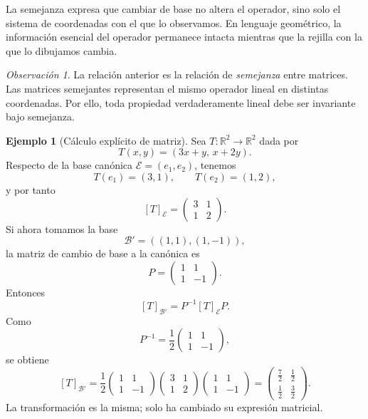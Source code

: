 \documentclass[10pt,a4paper,oneside]{article}
\theoremstyle{plain}
\theoremstyle{definition}
\newtheorem{example}[theorem]{Ejemplo}
\theoremstyle{remark}
\newtheorem{remark}[theorem]{Observación}
\newcommand{\R}{\mathbb{R}}
\begin{document}
\begin{intuitionBox}
La semejanza expresa que cambiar de base no altera el operador, sino solo el sistema de coordenadas con el que lo observamos. En lenguaje geométrico, la información esencial del operador permanece intacta mientras que la rejilla con la que lo dibujamos cambia.
\end{intuitionBox}

\begin{remark}
La relación anterior es la relación de \emph{semejanza} entre matrices. Las matrices semejantes representan el mismo operador lineal en distintas coordenadas. Por ello, toda propiedad verdaderamente lineal debe ser invariante bajo semejanza.
\end{remark}

\begin{example}[Cálculo explícito de matriz]
Sea \(T:\R^2\to\R^2\) dada por
\[
T(x,y)=(3x+y,\,x+2y).
\]
Respecto de la base canónica \(\mathcal{E}=(e_1,e_2)\), tenemos
\[
T(e_1)=(3,1),\qquad T(e_2)=(1,2),
\]
y por tanto
\[
[T]_{\mathcal{E}}=
\begin{pmatrix}
3 & 1\\
1 & 2
\end{pmatrix}.
\]
Si ahora tomamos la base
\[
\mathcal{B}'=((1,1),(1,-1)),
\]
la matriz de cambio de base a la canónica es
\[
P=
\begin{pmatrix}
1 & 1\\
1 & -1
\end{pmatrix}.
\]
Entonces
\[
[T]_{\mathcal{B}'}=P^{-1}[T]_{\mathcal{E}}P.
\]
Como
\[
P^{-1}=\frac12
\begin{pmatrix}
1 & 1\\
1 & -1
\end{pmatrix},
\]
se obtiene
\[
[T]_{\mathcal{B}'}=
\frac12
\begin{pmatrix}
1 & 1\\
1 & -1
\end{pmatrix}
\begin{pmatrix}
3 & 1\\
1 & 2
\end{pmatrix}
\begin{pmatrix}
1 & 1\\
1 & -1
\end{pmatrix}
=
\begin{pmatrix}
\frac72 & \frac12\\
\frac12 & \frac32
\end{pmatrix}.
\]
La transformación es la misma; solo ha cambiado su expresión matricial.
\end{example}
\end{document}
